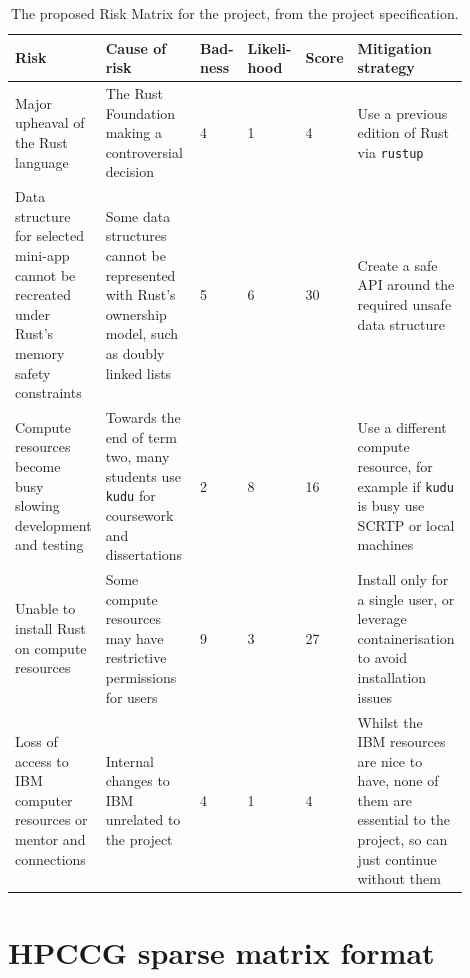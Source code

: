 \begin{table}[ht]
\begin{adjustwidth}{-3em}{-3em}
    \centering
    \caption{The proposed Risk Matrix for the project, from the project specification.}
    \label{tab:risk_matrix}
    \begin{tabular}{|p{0.2\linewidth}|p{0.25\linewidth}|p{0.065\linewidth}|p{0.085\linewidth}|p{0.055\linewidth}|p{0.24\linewidth}|} \hline
         \textbf{Risk} & \textbf{Cause of risk} & \textbf{Bad- ness} & \textbf{Likeli- hood} & \textbf{Score} & \textbf{Mitigation strategy}\\ \hline\hline
         Major upheaval of the Rust language&  The Rust Foundation making a controversial decision \cite{AmNoLonger2023} \cite{AddRFCGovernance} \cite{TelemetryGoToolchain}&  4&  1&  \cellcolor{green!25}4 & Use a previous edition of Rust via \texttt{rustup}\\ \hline 
         Data structure for selected \acrshort{mini-app} cannot be recreated under Rust's memory safety
  constraints&  Some data structures cannot be represented with Rust's ownership model, such as doubly linked lists \cite{leeBuildingMemorysafeNetwork2017}&  5&  6&  \cellcolor{red!25}30& Create a safe API around the required unsafe data structure\\ \hline 
         Compute resources become busy slowing development and testing&    Towards the end of term two, many students use \texttt{kudu} for coursework and dissertations&  2&  8&  \cellcolor{orange!25}16& Use a different compute resource, for example if \texttt{kudu} is busy use SCRTP or local machines\\ \hline 
         Unable to install Rust on compute resources&  Some compute resources may have restrictive permissions for users&  9&  3&  \cellcolor{red!25}27& Install only for a single user, or leverage containerisation to avoid installation issues\\ \hline 
 Loss of access to IBM computer resources or mentor and connections& Internal changes to IBM unrelated to the project& 4& 1& \cellcolor{green!25}4 &Whilst the IBM resources are nice to have, none of them are essential to the project, so can just continue without them\\ \hline
    \end{tabular}
    \end{adjustwidth}
\end{table}

\section{HPCCG sparse matrix format}
\label{sec:hpccg-sparse-matrix-appendix}

